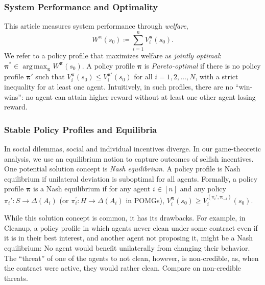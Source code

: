 \documentclass[referee,sn-basic]{sn-jnl}
\newcommand{\argmax}{\operatorname{arg\,max}}
\theoremstyle{thmstyleone}%
\theoremstyle{thmstyletwo}%
\theoremstyle{thmstylethree}%
\begin{document}
\subsubsection{System Performance and Optimality}
This article measures system performance through \emph{welfare},
\[
W^{\boldsymbol\pi} (s_0)\coloneqq \sum_{i=1}^n V_i^{\boldsymbol\pi}(s_0).
\]
We refer to a policy profile that maximizes welfare as \emph{jointly optimal}: $\boldsymbol\pi^* \in \argmax_{\boldsymbol\pi} W^{\boldsymbol\pi} (s_0)$. A policy profile $\boldsymbol\pi$ is \emph{Pareto-optimal} if there is no policy profile $\boldsymbol\pi'$ such that $V^{\boldsymbol\pi}_i (s_0) \le V^{\boldsymbol\pi'}_i (s_0)$ for all $i=1, 2, \dots, N$, with a strict inequality for at least one agent. Intuitively, in such profiles, there are no \enquote{win-wins}: no agent can attain higher reward without at least one other agent losing reward.

\subsubsection{Stable Policy Profiles and Equilibria}
In social dilemmas, social and individual incentives diverge. In our game-theoretic analysis, we use an equilibrium notion to capture outcomes of selfish incentives. One potential solution concept is \emph{Nash equilibrium}. A policy profile is Nash equilibrium if unilateral deviation is suboptimal for all agents. Formally, a policy profile $\boldsymbol\pi$ is a Nash equilibrium if for any agent $i \in [n]$ and any policy $\pi_i': S \to \Delta(A_i)$ (or $\pi_i^\prime: H \to \Delta(A_i)$ in POMGs), $V_i^{\boldsymbol\pi} (s_0) \ge V_i^{(\pi_i', \boldsymbol\pi_{-i})} (s_0)$.

While this solution concept is common, it has its drawbacks. For example, in Cleanup, a policy profile in which agents never clean under some contract even if it is in their best interest, and another agent not proposing it, might be a Nash equilibrium: No agent would benefit unilaterally from changing their behavior. The \enquote{threat} of one of the agents to not clean, however, is non-credible, as, when the contract were active, they would rather clean. Compare \cite[Section 5.5]{osborne1994course} on non-credible threats.
\end{document}
